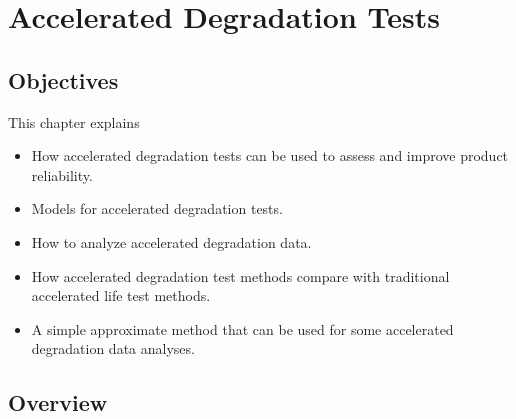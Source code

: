 \setcounter{chapter}{20}


\chapter{Accelerated Degradation Tests}
\label{chapter:accelerated.degradation}



\section*{Objectives}
This chapter explains
\begin{itemize} 
\item 
How accelerated degradation tests
can be used to assess and improve product reliability.
\item 
Models for accelerated degradation tests.
\item 
How to analyze accelerated degradation data.
\item 
How accelerated degradation test methods compare
with traditional accelerated life test methods.
\item 
A simple approximate method that can be used for some accelerated
degradation data analyses.
\end{itemize}
\section*{Overview}

